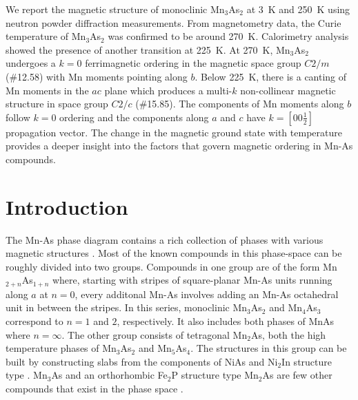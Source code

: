 \documentclass[letterpaper,10pt,doublespacing,edeposit]{uiucthesis2020}
\begin{document}
\begin{mainmatter}
We report the magnetic structure of monoclinic Mn$_3$As$_2$ at 3~K and 250~K using neutron powder diffraction measurements. From magnetometry data, the Curie temperature of Mn$_3$As$_2$ was confirmed to be around 270~K. Calorimetry analysis showed the presence of another transition at 225~K. At 270~K, Mn$_3$As$_2$ undergoes a $k = 0$ ferrimagnetic ordering in the magnetic space group $C2/m$ (\#12.58) with Mn moments pointing along $b$. Below 225~K, there is a canting of Mn moments in the $ac$ plane which produces a multi-$k$  non-collinear magnetic structure in space group $C2/c$ (\#15.85). The components of Mn moments along $b$ follow $k=0$ ordering and the components along $a$ and $c$ have $k = [0 0 \frac{1}{2}]$ propagation vector. The change in the magnetic ground state with temperature provides a deeper insight into the factors that govern magnetic ordering in Mn-As compounds.





\section{Introduction} 



The Mn-As phase diagram contains a rich collection of phases with various magnetic structures \cite{Bacon1955,Yuzuri1960,Carrillo-Cabrera1983,Dietrich1990,Moller1993,Hagedorn1994,Hagedorn1995}. Most of the known compounds in this phase-space can be roughly divided into two groups. Compounds in one group are of the form Mn$_{2+n}$As$_{1+n}$ where, starting with stripes of square-planar Mn-As units running along $a$ at $n=0$, every additonal Mn-As involves adding an Mn-As octahedral unit in between the stripes.
In this series, monoclinic Mn$_3$As$_2$ and Mn$_4$As$_3$ correspond to $n=1$ and $2$, respectively. 
It also includes both phases of MnAs where $n=\infty$. The other group consists of tetragonal Mn$_2$As, both the high temperature phases of Mn$_3$As$_2$ and Mn$_5$As$_4$. The structures in this group can be built by constructing slabs from the components of NiAs and Ni$_2$In structure type \cite{Hagedorn1995}. Mn$_3$As and an orthorhombic Fe$_2$P structure type Mn$_2$As are few other compounds that exist in the phase space \cite{Jeitschko1972,Carrillo-Cabrera1983}.


\end{mainmatter}
\end{document}
